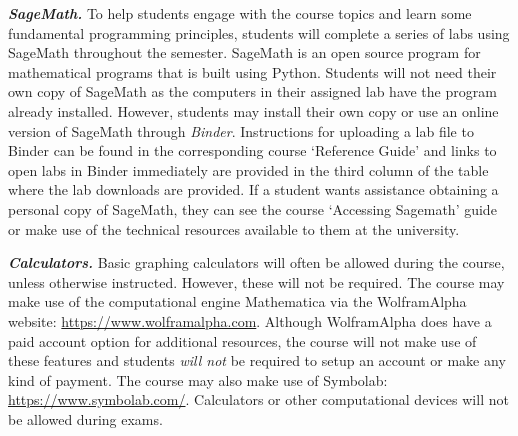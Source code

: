 \documentclass[11pt,letterpaper]{article}
\begin{document}
{\itshape\bfseries\color{scred}SageMath.} To help students engage with the course topics and learn some fundamental programming principles, students will complete a series of labs using SageMath throughout the semester. SageMath is an open source program for mathematical programs that is built using Python. Students will not need their own copy of SageMath as the computers in their assigned lab have the program already installed. However, students may install their own copy or use an online version of SageMath through \textit{Binder}. Instructions for uploading a lab file to Binder can be found in the corresponding course `Reference Guide' and links to open labs in Binder immediately are provided in the third column of the table where the lab downloads are provided. If a student wants assistance obtaining a personal copy of SageMath, they can see the course `Accessing Sagemath' guide or make use of the technical resources available to them at the university. \pspace

{\itshape\bfseries\color{scred}Calculators.} Basic graphing calculators will often be allowed during the course, unless otherwise instructed. However, these will not be required. The course may make use of the computational engine Mathematica via the WolframAlpha website: \url{https://www.wolframalpha.com}. Although WolframAlpha does have a paid account option for additional resources, the course will not make use of these features and students {\itshape will not} be required to setup an account or make any kind of payment. The course may also make use of Symbolab: \url{https://www.symbolab.com/}. Calculators or other computational devices will not be allowed during exams. 
\sectionbreak



\end{document}
